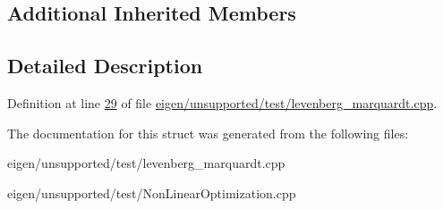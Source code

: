 \subsection*{Additional Inherited Members}


\subsection{Detailed Description}


Definition at line \hyperlink{eigen_2unsupported_2test_2levenberg__marquardt_8cpp_source_l00029}{29} of file \hyperlink{eigen_2unsupported_2test_2levenberg__marquardt_8cpp_source}{eigen/unsupported/test/levenberg\+\_\+marquardt.\+cpp}.



The documentation for this struct was generated from the following files\+:\begin{DoxyCompactItemize}
\item 
eigen/unsupported/test/levenberg\+\_\+marquardt.\+cpp\item 
eigen/unsupported/test/\+Non\+Linear\+Optimization.\+cpp\end{DoxyCompactItemize}
